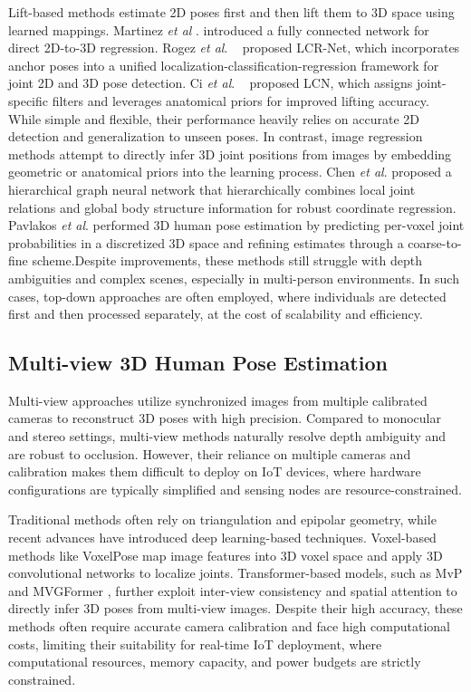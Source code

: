 \documentclass[journal]{IEEEtran}
\begin{document}
Lift-based methods estimate 2D poses first and then lift them to 3D space using learned mappings. Martinez \textit{et al} . introduced a fully connected network for direct 2D-to-3D regression. Rogez \textit{et al}. ~ proposed LCR-Net, which incorporates anchor poses into a unified localization-classification-regression framework for joint 2D and 3D pose detection. Ci \textit{et al}. ~ proposed LCN, which assigns joint-specific filters and leverages anatomical priors for improved lifting accuracy. While simple and flexible, their performance heavily relies on accurate 2D detection and generalization to unseen poses. In contrast, image regression methods attempt to directly infer 3D joint positions from images by embedding geometric or anatomical priors into the learning process. Chen \textit{et al}.  proposed a hierarchical graph neural network that hierarchically combines local joint relations and global body structure information for robust coordinate regression. Pavlakos \textit{et al}.  performed 3D human pose estimation by predicting per-voxel joint probabilities in a discretized 3D space and refining estimates through a coarse-to-fine scheme.Despite improvements, these methods still struggle with depth ambiguities and complex scenes, especially in multi-person environments. In such cases, top-down approaches  are often employed, where individuals are detected first and then processed separately, at the cost of scalability and efficiency.

\subsection{Multi-view 3D Human Pose Estimation}

Multi-view approaches utilize synchronized images from multiple calibrated cameras to reconstruct 3D poses with high precision. Compared to monocular and stereo settings, multi-view methods naturally resolve depth ambiguity and are robust to occlusion. However, their reliance on multiple cameras and calibration makes them difficult to deploy on IoT devices, where hardware configurations are typically simplified and sensing nodes are resource-constrained.

Traditional methods often rely on triangulation and epipolar geometry, while recent advances have introduced deep learning-based techniques. Voxel-based methods like VoxelPose  map image features into 3D voxel space and apply 3D convolutional networks to localize joints. Transformer-based models, such as MvP  and MVGFormer , further exploit inter-view consistency and spatial attention to directly infer 3D poses from multi-view images. Despite their high accuracy, these methods often require accurate camera calibration and face high computational costs, limiting their suitability for real-time IoT deployment, where computational resources, memory capacity, and power budgets are strictly constrained.
\end{document}
